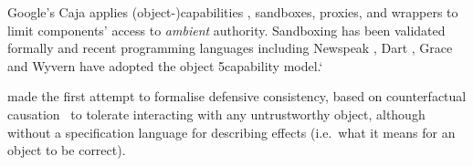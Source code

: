 






Google's Caja \cite{Caja} applies
(object-)capabilities \cite{Dennis66,JamesMorris,MillerPhD}, 
sandboxes, proxies, and wrappers
 to limit components'
access to \textit{ambient} authority.
Sandboxing has been validated
formally %
\cite{mmt-oakland10} 
and 
recent programming languages %
\cite{CapJavaHayesAPLAS17,CapNetSocc17Eide,DOCaT14} including Newspeak
\cite{newspeak17}, Dart \cite{dart15}, Grace \cite{grace,graceClasses}
and Wyvern \cite{wyverncapabilities} have adopted the object
5capability model.`


\citet{Murray10dphil} made the first attempt to formalise defensive
consistency, based on counterfactual causation~\cite{Lewis_73}
to tolerate interacting with any untrustworthy object,
although
%
%
%
without a specification language for describing effects (i.e.\ what it
means for an object to be correct).


